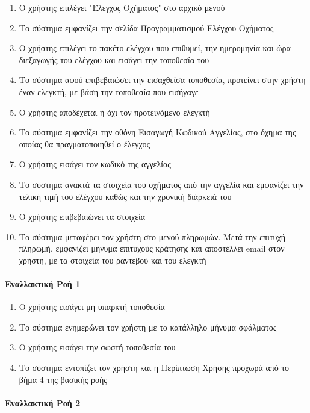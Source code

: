 \documentclass{../ol-softwaremanual}
\begin{document}
	\begin{enumerate}
		\item Ο χρήστης επιλέγει \en"\gr Έλεγχος Οχήματος\en" \gr στο αρχικό μενού
		\item Το σύστημα εμφανίζει την σελίδα Προγραμματισμού Ελέγχου Οχήματος
		\item Ο χρήστης επιλέγει το πακέτο ελέγχου που επιθυμεί, την ημερομηνία και ώρα διεξαγωγής του ελέγχου και εισάγει την τοποθεσία του
		\item Το σύστημα αφού επιβεβαιώσει την εισαχθείσα τοποθεσία, προτείνει στην χρήστη έναν ελεγκτή, με βάση την τοποθεσία που εισήγαγε
		\item Ο χρήστης αποδέχεται ή όχι τον προτεινόμενο ελεγκτή
		\item Το σύστημα εμφανίζει την οθόνη Εισαγωγή Κωδικού Αγγελίας, στο όχημα της οποίας θα πραγματοποιηθεί ο έλεγχος		
		\item Ο χρήστης εισάγει τον κωδικό της αγγελίας
		\item Το σύστημα ανακτά τα στοιχεία του οχήματος από την αγγελία και εμφανίζει την τελική τιμή του ελέγχου καθώς και την χρονική διάρκειά του
		\item Ο χρήστης επιβεβαιώνει τα στοιχεία
		\item Το σύστημα μεταφέρει τον χρήστη στο μενού πληρωμών. Μετά την επιτυχή πληρωμή, εμφανίζει μήνυμα επιτυχούς κράτησης και αποστέλλει \en email \gr στον χρήστη, με τα στοιχεία του ραντεβού και του ελεγκτή		
	\end{enumerate}
	
	\paragraph{Εναλλακτική Ροή 1}
	
	\begin{enumerate}
		\item Ο χρήστης εισάγει μη-υπαρκτή τοποθεσία
		\item Το σύστημα ενημερώνει τον χρήστη με το κατάλληλο μήνυμα σφάλματος 
		\item Ο χρήστης εισάγει την σωστή τοποθεσία του
		\item Το σύστημα εντοπίζει τον χρήστη και η Περίπτωση Χρήσης προχωρά από το βήμα 4 της βασικής ροής
	\end{enumerate}

	\paragraph{Εναλλακτική Ροή 2}
	
\end{document}
